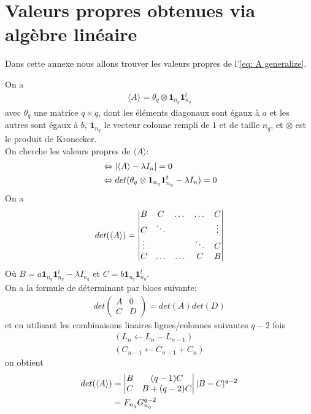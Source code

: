 \section{Valeurs propres obtenues via algèbre linéaire}\label{annexe: A}
Dans cette annexe nous allons trouver les valeurs propres de l'\autoref{eq: A generalize}.

On a 
\begin{align*}
	\langle A \rangle = \theta_q \otimes \mathbf{1}_{n_q} \mathbf{1}_{n_q}^t
\end{align*}
avec $\theta_q$ une matrice $q \times q$, dont les éléments diagonaux sont égaux à $a$ et les autres sont égaux à $b$, $\mathbf{1}_{n_q}$ le vecteur colonne rempli de $1$ et de taille $n_q$, et $\otimes$ est le produit de Kronecker.\\
On cherche les valeurs propres de $\langle A \rangle$: 
\begin{align*}
	&\Leftrightarrow 
		|\langle A \rangle - \lambda I_n| = 0\\
	&\Leftrightarrow 
		det(\theta_q \otimes \mathbf{1}_{n_q} \mathbf{1}_{n_q}^t - \lambda I_n) = 0
\end{align*}
On a 
\begin{align*}
	det(\langle A \rangle) &= 
\begin{vmatrix}
B & C &  \dots & \dots & C \\ 
C & \ddots &  & & \vdots \\ 
\vdots &  &  & \ddots & C \\ 
C & \ldots & \ldots & C & B
\end{vmatrix} \\
\end{align*}
Où $B = a\mathbf{1}_{n_q} \mathbf{1}_{n_q}^t - \lambda I_{n_q}$ et $C = b \mathbf{1}_{n_q} \mathbf{1}_{n_q}^t$.\\

On a la formule de déterminant par blocs suivante: 
\begin{align*}
det \left(\begin{matrix} A & 0 \\ C & D \end{matrix} \right) = det(A)det(D)
\end{align*}
et en utilisant les combinaisons linaires lignes/colonnes suivantes $q-2$ fois
\begin{align}\label{eq: matrix method}
	(L_n \leftarrow L_n  - L_{n-1}) \\
	(C_{n-1} \leftarrow C_{n-1}  + C_n) \nonumber
\end{align}
on obtient
\begin{align*}
	det(\langle A \rangle ) &= 
	\begin{vmatrix}
	B & (q-1)C\\
	C & B + (q-2)C
	\end{vmatrix}
	| B - C |^{q-2} \\
	 &= F_{n_q}G_{n_q}^{q-2}
\end{align*}

